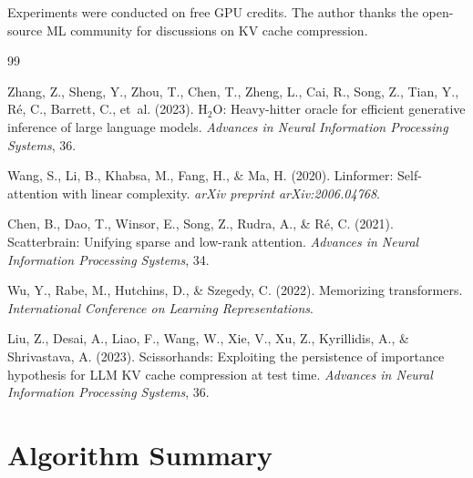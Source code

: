 \documentclass[11pt,a4paper]{article}
\begin{document}
Experiments were conducted on free GPU credits. The author thanks the open-source ML community for discussions on KV cache compression.


\begin{thebibliography}{99}

Zhang, Z., Sheng, Y., Zhou, T., Chen, T., Zheng, L., Cai, R., Song, Z., Tian, Y., R{\'e}, C., Barrett, C., et~al. (2023).
\newblock H$_2$O: Heavy-hitter oracle for efficient generative inference of large language models.
\newblock \emph{Advances in Neural Information Processing Systems}, 36.

Wang, S., Li, B., Khabsa, M., Fang, H., \& Ma, H. (2020).
\newblock Linformer: Self-attention with linear complexity.
\newblock \emph{arXiv preprint arXiv:2006.04768}.

Chen, B., Dao, T., Winsor, E., Song, Z., Rudra, A., \& R{\'e}, C. (2021).
\newblock Scatterbrain: Unifying sparse and low-rank attention.
\newblock \emph{Advances in Neural Information Processing Systems}, 34.

Wu, Y., Rabe, M., Hutchins, D., \& Szegedy, C. (2022).
\newblock Memorizing transformers.
\newblock \emph{International Conference on Learning Representations}.

Liu, Z., Desai, A., Liao, F., Wang, W., Xie, V., Xu, Z., Kyrillidis, A., \& Shrivastava, A. (2023).
\newblock Scissorhands: Exploiting the persistence of importance hypothesis for LLM KV cache compression at test time.
\newblock \emph{Advances in Neural Information Processing Systems}, 36.

\end{thebibliography}

\appendix
\section{Algorithm Summary}
\end{document}
